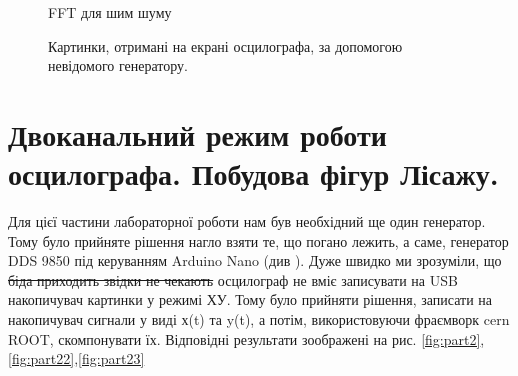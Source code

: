 \begin{figure}[h]
\begin{minipage}[h]{0.47\linewidth}
		 FFT для шим шуму\\
	\end{minipage}
	\caption{Картинки, отримані на екрані осцилографа, за допомогою невідомого генератору.}
	\label{fig:part1}
\end{figure}

\section{Двоканальний режим роботи осцилографа. Побудова фігур Лісажу.}

Для цієї частини лабораторної роботи нам був необхідний ще один генератор. Тому було прийняте рішення нагло взяти те, що погано лежить, а саме, генератор DDS 9850 під керуванням Arduino Nano (див \cite{lab3}). Дуже швидко ми зрозуміли, що \sout{біда приходить звідки не чекають} осцилограф не вміє записувати на USB накопичувач картинки у режимі ХУ. Тому було прийняти рішення, записати на накопичувач сигнали у виді х(t) та y(t), а потім, використовуючи фраємворк cern ROOT, скомпонувати їх. Відповідні результати зоображені на рис. \ref{fig:part2},\ref{fig:part22},\ref{fig:part23}

